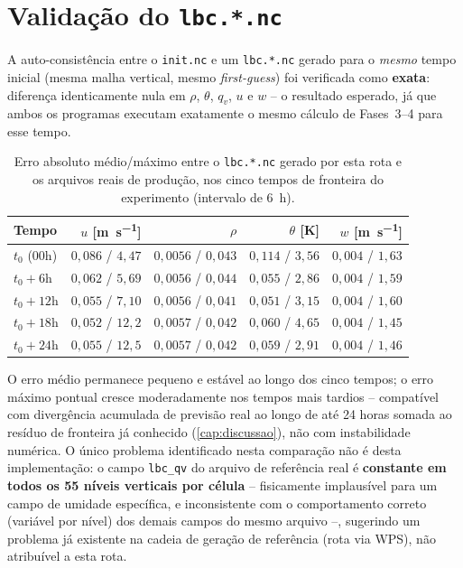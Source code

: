 \section{Validação do \texttt{lbc.*.nc}}

A auto-consistência entre o \texttt{init.nc} e um \texttt{lbc.*.nc}
gerado para o \emph{mesmo} tempo inicial (mesma malha vertical, mesmo
\textit{first-guess}) foi verificada como \textbf{exata}: diferença
identicamente nula em $\rho$, $\theta$, $q_v$, $u$ e $w$ -- o resultado
esperado, já que ambos os programas executam exatamente o mesmo cálculo
de Fases~3--4 para esse tempo.

\begin{table}[H]
\centering
\caption{Erro absoluto médio/máximo entre o \texttt{lbc.*.nc} gerado por
  esta rota e os arquivos reais de produção, nos cinco tempos de
  fronteira do experimento (intervalo de 6~h).}
\label{tab:validacao_lbc}
\begin{tabular}{@{}lrrrr@{}}
\toprule
Tempo & $u$ [\si{\meter\per\second}] & $\rho$ & $\theta$ [\si{\kelvin}] & $w$ [\si{\meter\per\second}] \\
\midrule
$t_0$ (00h)  & $0{,}086$ / $4{,}47$  & $0{,}0056$ / $0{,}043$ & $0{,}114$ / $3{,}56$ & $0{,}004$ / $1{,}63$ \\
$t_0+6$h  & $0{,}062$ / $5{,}69$  & $0{,}0056$ / $0{,}044$ & $0{,}055$ / $2{,}86$ & $0{,}004$ / $1{,}59$ \\
$t_0+12$h & $0{,}055$ / $7{,}10$  & $0{,}0056$ / $0{,}041$ & $0{,}051$ / $3{,}15$ & $0{,}004$ / $1{,}60$ \\
$t_0+18$h & $0{,}052$ / $12{,}2$  & $0{,}0057$ / $0{,}042$ & $0{,}060$ / $4{,}65$ & $0{,}004$ / $1{,}45$ \\
$t_0+24$h & $0{,}055$ / $12{,}5$  & $0{,}0057$ / $0{,}042$ & $0{,}059$ / $2{,}91$ & $0{,}004$ / $1{,}46$ \\
\bottomrule
\end{tabular}
\end{table}

O erro médio permanece pequeno e estável ao longo dos cinco tempos; o
erro máximo pontual cresce moderadamente nos tempos mais tardios --
compatível com divergência acumulada de previsão real ao longo de até 24
horas somada ao resíduo de fronteira já conhecido (\cref{cap:discussao}),
não com instabilidade numérica. O único problema identificado nesta
comparação não é desta implementação: o campo \texttt{lbc\_qv} do
arquivo de referência real é \textbf{constante em todos os 55 níveis
verticais por célula} -- fisicamente implausível para um campo de
umidade específica, e inconsistente com o comportamento correto (variável
por nível) dos demais campos do mesmo arquivo --, sugerindo um problema
já existente na cadeia de geração de referência (rota via WPS), não
atribuível a esta rota.


